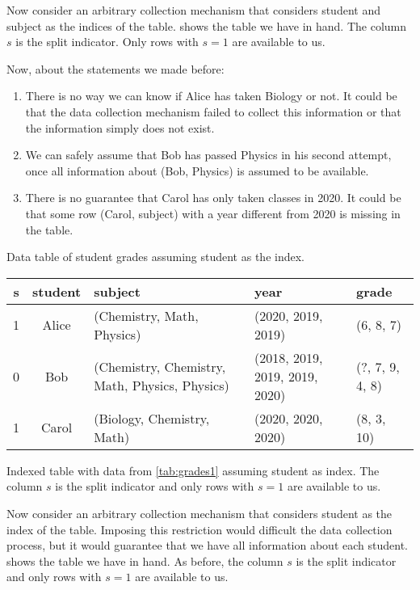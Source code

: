 Now consider an arbitrary collection mechanism that considers student and subject as the
indices of the table.   shows the table we have in hand.  The column $s$
is the split indicator.  Only rows with $s = 1$ are available to us.

Now, about the statements we made before:
\begin{enumerate}
  \itemsep0em
  \item There is no way we can know if Alice has taken Biology or not.  It could be that
    the data collection mechanism failed to collect this information or that the
    information simply does not exist.
  \item We can safely assume that Bob has passed Physics in his second attempt, once all
    information about (Bob, Physics) is assumed to be available.
  \item There is no guarantee that Carol has only taken classes in 2020.  It could be that
    some row (Carol, subject) with a year different from 2020 is missing in the table.
\end{enumerate}

\begin{tablebox}[label=tab:grades3]{Data table of student grades assuming student as the index.}
  \centering
  \begin{tabular}{ccp{2.6cm}p{1.8cm}>{\raggedright\arraybackslash}p{1.2cm}}
    \toprule
    \textbf{s} & \textbf{student} & \textbf{subject} & \textbf{year} & \textbf{grade} \\
    \midrule
    1 & Alice & (Chemistry, Math, Physics) & (2020, 2019, 2019) & (6, 8, 7) \\
    0 & Bob & (Chemistry, Chemistry, Math, Physics, Physics) & (2018, 2019, 2019, 2019, 2020) & (?, 7, 9, 4, 8) \\
    1 & Carol & (Biology, Chemistry, Math) & (2020, 2020, 2020) & (8, 3, 10) \\
    \bottomrule
  \end{tabular}
  \tcblower
  Indexed table with data from \cref{tab:grades1} assuming student
  as index.  The column $s$ is the split indicator and only rows with $s = 1$ are available to us.
\end{tablebox}

Now consider an arbitrary collection mechanism that considers student as the index of the table.
Imposing this restriction would difficult the data collection process, but it would
guarantee that we have all information about each student.   shows the
table we have in hand.  As before, the column $s$ is the split indicator and only rows with
$s = 1$ are available to us.

